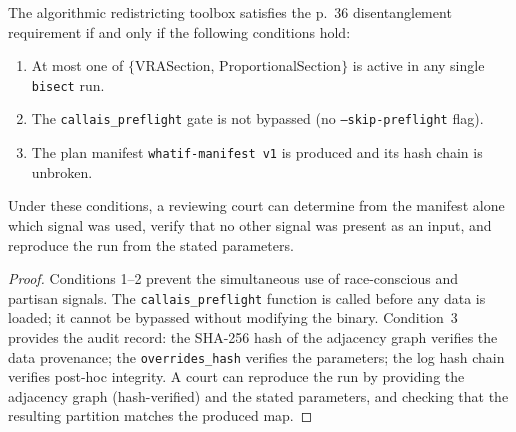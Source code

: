 \begin{proposition}
\label{prop:callais}
The algorithmic redistricting toolbox satisfies the \callais{} p.~36
disentanglement requirement if and only if the following conditions hold:
\begin{enumerate}
  \item At most one of $\{$VRASection, ProportionalSection$\}$ is active in
    any single \texttt{bisect} run.
  \item The \texttt{callais\_preflight} gate is not bypassed (no
    \texttt{--skip-preflight} flag).
  \item The plan manifest \texttt{whatif-manifest v1} is produced and its
    hash chain is unbroken.
\end{enumerate}
Under these conditions, a reviewing court can determine from the manifest alone
which signal was used, verify that no other signal was present as an input,
and reproduce the run from the stated parameters.
\end{proposition}

\begin{proof}
Conditions 1--2 prevent the simultaneous use of race-conscious and partisan
signals.
The \texttt{callais\_preflight} function is called before any data is loaded;
it cannot be bypassed without modifying the binary.
Condition~3 provides the audit record: the SHA-256 hash of the adjacency graph
verifies the data provenance; the \texttt{overrides\_hash} verifies the
parameters; the log hash chain verifies post-hoc integrity.
A court can reproduce the run by providing the adjacency graph (hash-verified)
and the stated parameters, and checking that the resulting partition matches
the produced map.
\end{proof}
